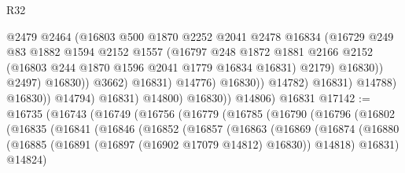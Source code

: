 \begin{lexlean}{R32}
\begin{coremodule}
                                          @2479
                                          @2464
                                          (@16803
                                            @500
                                            @1870
                                            @2252
                                            @2041
                                            @2478
                                            @16834
                                            (@16729
                                              @249
                                              @83
                                              @1882
                                              @1594
                                              @2152
                                              @1557
                                              (@16797
                                                @248
                                                @1872
                                                @1881
                                                @2166
                                                @2152
                                                (@16803 @244 @1870 @1596 @2041 @1779 @16834 @16831)
                                                @2179)
                                              @16830))
                                          @2497)
                                        @16830))
                                    @3662)
                                  @16831)
                                @14776)
                              @16830))
                          @14782)
                        @16831)
                      @14788)
                    @16830))
                @14794)
              @16831)
            @14800)
          @16830))
      @14806)
    @16831
@17142 := @16735
    (@16743
      (@16749
        (@16756
          (@16779
            (@16785
              (@16790
                (@16796
                  (@16802
                    (@16835
                      (@16841
                        (@16846
                          (@16852
                            (@16857
                              (@16863
                                (@16869
                                  (@16874
                                    (@16880
                                      (@16885
                                        (@16891 (@16897 (@16902 @17079 @14812) @16830))
                                        @14818)
                                      @16831)
                                    @14824)

\end{coremodule}
\end{lexlean}
